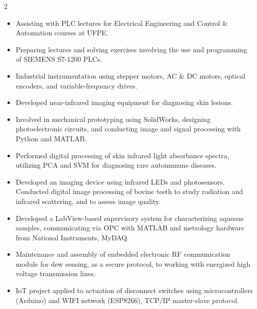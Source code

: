 \documentclass[10pt,a4paper,ragged2e,withhyper]{altacv}
\begin{document}
\begin{paracol}{2}
\begin{itemize}
\end{itemize}
\divider

\begin{itemize}

    \item Assisting with PLC lectures for Electrical Engineering and Control \& Automation courses at UFPE.
    \item Preparing lectures and solving exercises involving the use and programming of SIEMENS S7-1200 PLCs.
    \item Industrial instrumentation using stepper motors, AC \& DC motors, optical encoders, and variable-frequency drives.
    
\end{itemize}

\divider

\begin{itemize}

    \item Developed near-infrared imaging equipment for diagnosing skin lesions.
    \item Involved in mechanical prototyping using SolidWorks, designing photoelectronic circuits, and conducting image and signal processing with Python and MATLAB.
    \item Performed digital processing of skin infrared light absorbance spectra, utilizing PCA and SVM for diagnosing rare autoimmune diseases.
    \item Developed an imaging device using infrared LEDs and photosensors. Conducted digital image processing of bovine teeth to study radiation and infrared scattering, and to assess image quality.
    \item Developed a LabView-based supervisory system for characterizing aqueous samples, communicating via OPC with MATLAB and metrology hardware from National Instruments, MyDAQ.
    
\end{itemize}

\divider

\begin{itemize}

    \item Maintenance and assembly of embedded electronic RF communication module for dew sensing, as a secure protocol, to working with energized high voltage transmission lines.
    \item IoT project applied to actuation of disconnect switches using microcontrollers (Arduino) and WIFI network (ESP8266), TCP/IP master-slave protocol.
    

\end{itemize}
\end{paracol}
\end{document}
